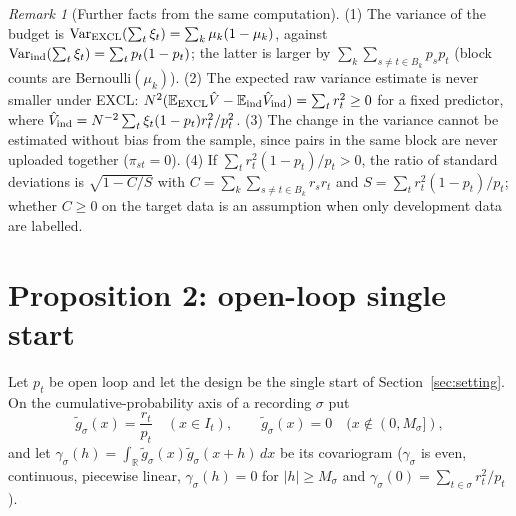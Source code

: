 \documentclass[11pt]{article}
\theoremstyle{remark}
\newtheorem{remark}{Remark}
\newcommand{\E}{\mathbb{E}}
\newcommand{\Var}{\mathrm{Var}}
\newcommand{\hV}{\hat V}
\begin{document}
\begin{remark}[Further facts from the same computation]
(1) The variance of the budget is $\Var_{\rm EXCL}(\sum_t\xi_t)=\sum_k\mu_k(1-\mu_k)$, against $\Var_{\rm ind}(\sum_t\xi_t)=\sum_tp_t(1-p_t)$; the latter is larger by $\sum_k\sum_{s\ne t\in B_k}p_sp_t$ (block counts are Bernoulli$(\mu_k)$). (2) The expected raw variance estimate is never smaller under EXCL: $N^2(\E_{\rm EXCL}\hV-\E_{\rm ind}\hV_{\rm ind})=\sum_tr_t^2\ge0$ for a fixed predictor, where $\hV_{\rm ind}=N^{-2}\sum_t\xi_t(1-p_t)r_t^2/p_t^2$. (3) The change in the variance cannot be estimated without bias from the sample, since pairs in the same block are never uploaded together ($\pi_{st}=0$). (4) If $\sum_t r_t^2(1-p_t)/p_t>0$, the ratio of standard deviations is $\sqrt{1-C/S}$ with $C=\sum_k\sum_{s\ne t\in B_k}r_sr_t$ and $S=\sum_tr_t^2(1-p_t)/p_t$; whether $C\ge0$ on the target data is an assumption when only development data are labelled.
\end{remark}

\section{Proposition 2: open-loop single start}\label{sec:prop2}
Let $p_t$ be open loop and let the design be the single start of Section~\ref{sec:setting}. On the cumulative-probability axis of a recording $\sigma$ put
\[
\tilde g_\sigma(x)=\frac{r_t}{p_t}\quad(x\in I_t),\qquad\tilde g_\sigma(x)=0\quad(x\notin(0,M_\sigma]),
\]
and let $\gamma_\sigma(h)=\int_{\mathbb R}\tilde g_\sigma(x)\tilde g_\sigma(x+h)\,dx$ be its covariogram ($\gamma_\sigma$ is even, continuous, piecewise linear, $\gamma_\sigma(h)=0$ for $|h|\ge M_\sigma$ and $\gamma_\sigma(0)=\sum_{t\in\sigma}r_t^2/p_t$).
\end{document}
